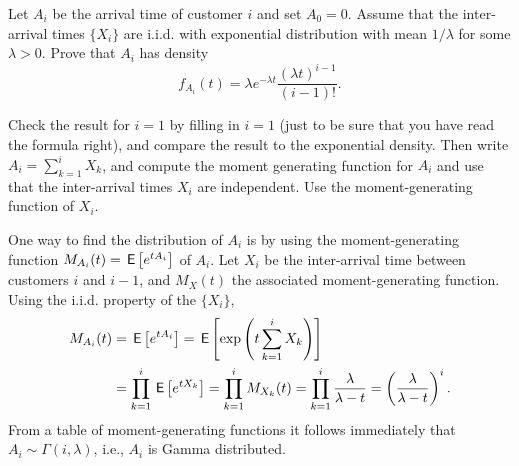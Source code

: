 \begin{extra}
    Let $A_i$ be the arrival time of customer $i$ and set $A_0=0$.
    Assume that the inter-arrival times $\{X_i\}$ are i.i.d.
    with exponential distribution with mean $1/\lambda$ for some $\lambda>0$.
    Prove that $A_i$ has density
\begin{equation*}
f_{A_i}(t) = \lambda e^{-\lambda t} \frac{(\lambda t)^{i-1}}{(i-1)!}.
\end{equation*}
\begin{hint}
 Check the result for $i=1$ by filling in $i=1$ (just to be
     sure that you have read the formula right), and compare the result
     to the exponential density. Then write $A_i =\sum_{k=1}^i X_k$, and compute the moment
     generating function for $A_i$ and use that the inter-arrival times
     $X_i$ are independent. Use the moment-generating function  of $X_i$.
\end{hint}
\begin{solution}
  One way to find the distribution of $A_i$ is by using the moment-generating function $M_{A_i}(t) = \,\mathsf{E}\left[e^{t A_i}\right]$ of $A_i$.
  Let $X_i$ be the inter-arrival time between customers $i$ and $i-1$, and $M_X(t)$ the associated moment-generating function.
  Using the i.i.d.
  property of the $\{X_i\}$,
\begin{align*}
  M_{A_i}(t) &= \,\mathsf{E}\left[e^{t A_i}\right] = \,\mathsf{E}\left[\exp\left(t\sum_{k=1}^{i} X_k\right)\right] \\
& = \prod_{k=1}^{i} \,\mathsf{E}\left[e^{tX_k}\right] = 
\prod_{k=1}^{i} M_{X_k}(t) = 
\prod_{k=1}^{i} \frac{\lambda}{\lambda -t }
 = \left(\frac{\lambda}{\lambda -t }\right)^i.
\end{align*}
From a table of moment-generating functions it follows immediately that
$A_i \sim \Gamma(i,\lambda)$, i.e., $A_i$ is Gamma distributed.
\end{solution}
\end{extra}

